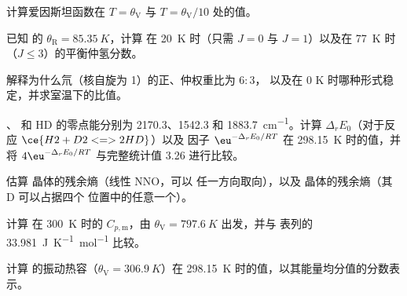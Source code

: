 \begin{exercise}[$\star$]\label{exo:b3:statistical-thermo-applied:2}
计算爱因斯坦函数在 $T = \theta_{\mathrm V}$ 与 $T = \theta_{\mathrm V}/10$ 处的值。
\end{exercise}

\begin{exercise}[$\star$]\label{exo:b3:statistical-thermo-applied:3}
已知  的 $\theta_{\mathrm R} = \qty{85.35}{K}$，计算
在 \qty{20}{K} 时（只需 $J = 0$ 与 $J = 1$）以及在 \qty{77}{K} 时（$J \le 3$）的平衡仲氢分数。
\end{exercise}

\begin{exercise}[$\star$]\label{exo:b3:statistical-thermo-applied:4}
解释为什么氘（核自旋为 1）的正、仲权重比为 $6 : 3$，
以及在 0 K 时哪种形式稳定，并求室温下的比值。
\end{exercise}

\begin{exercise}[$\star\star$]\label{exo:b3:statistical-thermo-applied:5}
、 和 HD 的零点能分别为 2170.3、1542.3 和
\qty{1883.7}{cm^{-1}}。计算 $\Delta_rE_0$（对于反应 $\ce{H2 + D2 <=> 2 HD}$）以及
因子 $\eu^{-\Delta_rE_0/RT}$ 在 \qty{298.15}{K} 时的值，并将 $4\eu^{-\Delta_rE_0/RT}$ 与完整统计值 3.26 进行比较。
\end{exercise}

\begin{exercise}[$\star\star$]\label{exo:b3:statistical-thermo-applied:6}
估算  晶体的残余熵（线性 NNO，可以
任一方向取向），以及  晶体的残余熵（其 D 可以占据四个
位置中的任意一个）。
\end{exercise}

\begin{exercise}[$\star\star$]\label{exo:b3:statistical-thermo-applied:7}
计算  在 \qty{300}{K} 时的 $C_{p,\mathrm m}$，由 $\theta_{\mathrm V} = \qty{797.6}{K}$ 出发，并与
表列的 \qty{33.981}{J.K^{-1}.mol^{-1}} 比较。
\end{exercise}

\begin{exercise}[$\star\star$]\label{exo:b3:statistical-thermo-applied:8}
计算  的振动热容（$\theta_{\mathrm V} = \qty{306.9}{K}$）在
\qty{298.15}{K} 时的值，以其能量均分值的分数表示。
\end{exercise}


